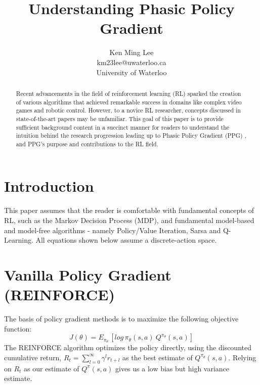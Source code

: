 \documentclass[11pt]{article} %
\title{Understanding Phasic Policy Gradient}
\author{Ken Ming Lee \\ km23lee@uwaterloo.ca \\ University of Waterloo}
\begin{document}
\maketitle
\begin{abstract}
Recent advancements in the field of reinforcement learning (RL) sparked the creation of various algorithms that achieved remarkable success in domains like complex video games and robotic control. However, to a novice RL researcher, concepts discussed in state-of-the-art papers may be unfamiliar. This goal of this paper is to provide sufficient background content in a succinct manner for readers to understand the intuition behind the research progression leading up to Phasic Policy Gradient (PPG) \cite{ppg}, and PPG's purpose and contributions to the RL field.
\end{abstract}

\section{Introduction}
This paper assumes that the reader is comfortable with fundamental concepts of RL, such as the Markov Decision Process (MDP), and fundamental model-based and model-free algorithms - namely Policy/Value Iteration, Sarsa and Q-Learning. All equations shown below assume a discrete-action space.

\section{Vanilla Policy Gradient (REINFORCE)}
The basis of policy gradient methods is to maximize the following objective function:
\begin{equation*}
    J(\theta) = E_{\pi_\theta}\,[log\,\pi_\theta(s,a)\: Q^{\pi_\theta}(s,a)]
\end{equation*}
The REINFORCE algorithm \cite{reinforce} optimizes the policy directly, using the discounted cumulative return, $R_t = \sum_{l=0}^\infty \gamma^l r_{t+l}$ as the best estimate of $Q^{\pi_\theta}(s,a)$. Relying on $R_t$ as our estimate of $Q^{\pi}(s,a)$ gives us a low bias but high variance estimate.
\end{document}
